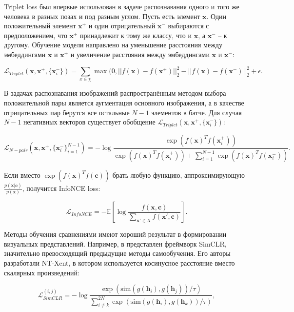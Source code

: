 \documentclass[a4paper, 14pt]{article}
\begin{document}
Triplet loss был впервые использован в задаче распознавания одного и того же человека в разных позах и под разным углом. Пусть есть элемент $\mathbf{x}$. Один положительный элемент $\textbf{x}^+$ и один отрицательный $\textbf{x}^-$ выбираются с предположением, что $\textbf{x}^+$ принадлежит к тому же классу, что и $\mathbf{x}$, а $\mathbf{x}^-$ -- к другому. Обучение модели направлено на уменьшение расстояния между эмбеддингами $\mathbf{x}$ и $\mathbf{x}^+$ и увеличение расстояния между эмбеддингами $\mathbf{x}$ и $\mathbf{x}^-$:

\begin{equation}
    \mathcal{L}_{Triplet}(\textbf{x}, \textbf{x}^+, \{\textbf{x}_i^-\}) = \sum\limits_{x \in \chi}\max(0, ||f(\textbf{x}) - f(\textbf{x}^+)||_2^2 - ||f(\textbf{x}) - f(\textbf{x}^-)||_2^2 + \epsilon.
\end{equation}

В задачах распознавания изображений распространённым методом выбора положительной пары является аугментация основного изображения, а в качестве отрицательных пар берутся все остальные $N - 1$ элементов в батче. Для случая $N - 1$ негативных векторов существует обобщение $\mathcal{L}_{Triplet}(\textbf{x}, \textbf{x}^+, \{\textbf{x}_i^-\})$:

\begin{equation}\label{eq:103}
    \mathcal{L}_{N-pair}(\textbf{x}, \textbf{x}^+, \{\textbf{x}_i^-\}_{i=1}^{N-1}) = - \log \frac{\exp(f(\textbf{x})^T f(\textbf{x}_i^+))}{\exp(f(\textbf{x})^T f(\textbf{x}_i^+)) + \sum _{i=1}^{N-1} \exp(f(\textbf{x})^Tf(\textbf{x}_i^-))}.
\end{equation}

Если вместо $\exp(f(\textbf{x})^T f(\textbf{c}))$ брать любую функцию, аппроксимирующую $\frac{p(\textbf{x}|\textbf{c})}{p(\textbf{x})}$, получится InfoNCE loss:

\[\mathcal{L}_{InfoNCE} = -\mathbb{E}\left[\log\frac{f(\textbf{x}, \textbf{c})}{\sum_{\mathbf{x}' \in X}f(\textbf{x}', \textbf{c})}\right].\]

Методы обучения сравнениями имеют хороший результат в формировании визуальных представлений. Например, в \citep{chen2020simple} представлен фреймворк SimCLR, значительно превосходящий предыдущие методы самообучения. Его авторы разработали NT-Xent, в котором используется косинусное расстояние вместо скалярных произведений:

\[\mathcal{L}_{SimCLR}^{(i, j)} = - \log\frac{\exp(\text{sim}(g(\mathbf{h}_i), g(\mathbf{h}_j)) / \tau)}{\sum\limits_{i \neq k}^{2N}\exp(\text{sim}(g(\mathbf{h}_i), g(\mathbf{h}_k)) / \tau)},\]
\end{document}
